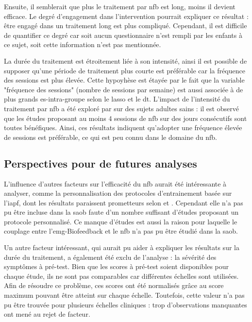 Ensuite, il semblerait que plus le traitement par \gls{nfb} est long, moins il devient efficace. Le degré d'engagement dans l'intervention pourrait expliquer ce
résultat : être engagé dans un traitement long est plus compliqué. Cependant, il est difficile de quantifier ce degré car soit aucun questionnaire n'est rempli 
par les enfants à ce sujet, soit cette information n'est pas mentionnée. 

La durée du traitement est étroitement liée à son intensité, ainsi il est possible de supposer qu'une période de traitement plus courte est préférable 
car la fréquence des sessions est plus élevée. Cette hypoyhèse est étayée par 
le fait que la variable "fréquence des sessions" (nombre de sessions par semaine) est aussi associée à de plus grands \gls{es}-intra-groupe selon le
\gls{lasso} et le \gls{dt}. L'impact de l'intensité du traitement par \gls{nfb} a été exploré par \citet{Rogala2016} sur des sujets adultes sains : il est
observé que les études proposant au moins 4 sessions de \gls{nfb} sur des jours consécutifs sont toutes bénéfiques. Ainsi, ces résultats indiquent qu'adopter une fréquence 
élevée de sessions est préférable, ce qui est peu connu dans le domaine du \gls{nfb}.

\subsection{Perspectives pour de futures analyses}

L'influence d'autres facteurs sur l'efficacité du \gls{nfb} aurait été intéressante à analyser, comme la personnalisation des protocoles d'entrainement basée sur l'\gls{iapf},
dont les résultats paraissent prometteurs selon \citet{Bazanova2018} et \citet{Escolano2014}. Cependant elle n'a pas pu être incluse dans la \gls{saob} faute d'un 
nombre suffisant d'études proposant un protocole personnalisé. Ce manque d'études est aussi la raison pour laquelle le couplage entre l'\gls{emg}-Biofeedback et le 
\gls{nfb} n'a pas pu être étudié dans la \gls{saob}. 

Un autre facteur intéressant, qui aurait pu aider à expliquer les résultats sur la durée du traitement, a 
également été exclu de l'analyse : la sévérité des symptômes à pré-test. Bien que les scores à pré-test soient disponibles pour chaque étude, ils ne sont pas
comparables car différentes échelles sont utilisées. Afin de résoudre ce problème, ces scores ont été normalisés grâce au score maximum pouvant être atteint
sur chaque échelle. Toutefois, cette valeur n'a pas pu être trouvée pour plusieurs échelles cliniques : trop d'observations manquantes ont mené au rejet de facteur.

